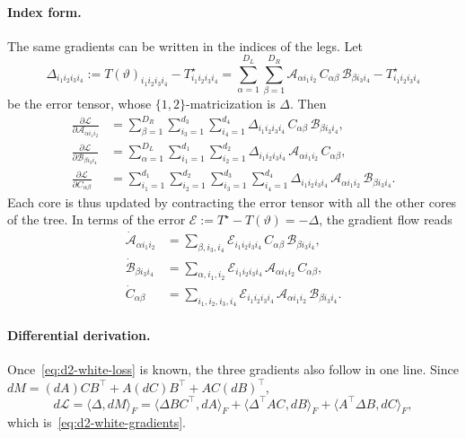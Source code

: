 \documentclass[11pt]{article}
\newcommand{\ip}[2]{\langle #1,#2\rangle}
\theoremstyle{definition}
\numberwithin{equation}{section}
\begin{document}
\paragraph{Index form.}
The same gradients can be written in the indices of the legs. Let
\begin{equation}\label{eq:d2-index-error}
\Delta_{i_1i_2i_3i_4}:=T(\vartheta)_{i_1i_2i_3i_4}-T^\star_{i_1i_2i_3i_4}=\sum_{\alpha=1}^{D_L}\sum_{\beta=1}^{D_R}\mathcal A_{\alpha i_1i_2}\,C_{\alpha\beta}\,\mathcal B_{\beta i_3i_4}-T^\star_{i_1i_2i_3i_4}
\end{equation}
be the error tensor, whose $\{1,2\}$-matricization is $\Delta$. Then
\begin{align}
\frac{\partial\mathcal L}{\partial\mathcal A_{\alpha i_1i_2}}&=\sum_{\beta=1}^{D_R}\sum_{i_3=1}^{d_3}\sum_{i_4=1}^{d_4}\Delta_{i_1i_2i_3i_4}\,C_{\alpha\beta}\,\mathcal B_{\beta i_3i_4},\label{eq:d2-index-grad-A}\\
\frac{\partial\mathcal L}{\partial\mathcal B_{\beta i_3i_4}}&=\sum_{\alpha=1}^{D_L}\sum_{i_1=1}^{d_1}\sum_{i_2=1}^{d_2}\Delta_{i_1i_2i_3i_4}\,\mathcal A_{\alpha i_1i_2}\,C_{\alpha\beta},\label{eq:d2-index-grad-B}\\
\frac{\partial\mathcal L}{\partial C_{\alpha\beta}}&=\sum_{i_1=1}^{d_1}\sum_{i_2=1}^{d_2}\sum_{i_3=1}^{d_3}\sum_{i_4=1}^{d_4}\Delta_{i_1i_2i_3i_4}\,\mathcal A_{\alpha i_1i_2}\,\mathcal B_{\beta i_3i_4}.\label{eq:d2-index-grad-C}
\end{align}
Each core is thus updated by contracting the error tensor with all the other cores of the tree. In terms of the error $\mathcal E:=T^\star-T(\vartheta)=-\Delta$, the gradient flow reads
\begin{equation}\label{eq:d2-index-flow}
\begin{aligned}
\dot{\mathcal A}_{\alpha i_1i_2}&=\sum_{\beta,i_3,i_4}\mathcal E_{i_1i_2i_3i_4}\,C_{\alpha\beta}\,\mathcal B_{\beta i_3i_4},\\
\dot{\mathcal B}_{\beta i_3i_4}&=\sum_{\alpha,i_1,i_2}\mathcal E_{i_1i_2i_3i_4}\,\mathcal A_{\alpha i_1i_2}\,C_{\alpha\beta},\\
\dot C_{\alpha\beta}&=\sum_{i_1,i_2,i_3,i_4}\mathcal E_{i_1i_2i_3i_4}\,\mathcal A_{\alpha i_1i_2}\,\mathcal B_{\beta i_3i_4}.
\end{aligned}
\end{equation}

\paragraph{Differential derivation.}
Once~\eqref{eq:d2-white-loss} is known, the three gradients also follow in one line. Since $dM=(dA)CB^\top+A(dC)B^\top+AC(dB)^\top$,
\begin{equation}\label{eq:d2-differential-proof}
d\mathcal L=\ip{\Delta}{dM}_F=\ip{\Delta BC^\top}{dA}_F+\ip{\Delta^\top AC}{dB}_F+\ip{A^\top\Delta B}{dC}_F,
\end{equation}
which is~\eqref{eq:d2-white-gradients}.
\end{document}

